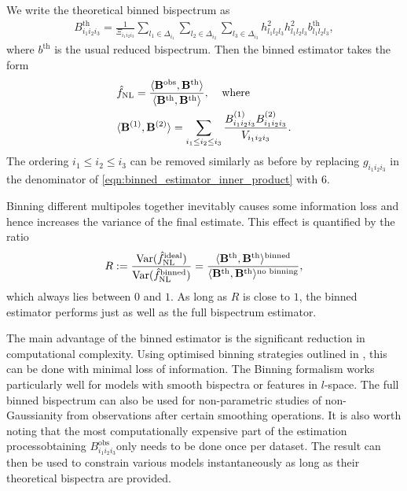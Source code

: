 We write the theoretical binned bispectrum as
\begin{align}
	B^\text{th}_{i_1 i_2 i_3} =  \frac{1}{\Xi_{i_1 i_2 i_3}} \sum_{l_1 \in \Delta_{i_1}} \sum_{l_2 \in \Delta_{i_2}} \sum_{l_3 \in \Delta_{i_3}} h^2_{l_1 l_2 l_3} h^2_{l_1 l_2 l_3} b^\text{th}_{l_1 l_2 l_3}, \label{eqn:binned_estimator_theoretical_bispectra}
\end{align}
where $b^\text{th}$ is the usual reduced bispectrum. Then the binned estimator takes the form
\begin{align}
	&\hat{f}_\text{NL} = \frac{\langle \mathbf{B}^\text{obs}, \mathbf{B}^\text{th} \rangle}{\langle \mathbf{B}^\text{th}, \mathbf{B}^\text{th} \rangle}, \;\;\;\;\text{where} \\
	&\langle \mathbf{B}^{(1)}, \mathbf{B}^{(2)} \rangle = \sum_{i_1 \le i_2 \le i_3} \frac{B^{(1)}_{i_1 i_2 i_3} B^{(2)}_{i_1 i_2 i_3}}{V_{i_1 i_2 i_3}}. \label{eqn:binned_estimator_inner_product}
\end{align}
The ordering $i_1 \le i_2 \le i_3$ can be removed similarly as before by replacing $g_{i_1 i_2 i_3}$ in the denominator of \eqref{eqn:binned_estimator_inner_product} with $6$.

Binning different multipoles together inevitably causes some information loss and hence increases the variance of the final estimate. This effect is quantified by the ratio
\begin{align}
	R := \frac{\text{Var}(\hat{f}^\text{ideal}_\text{NL})}{\text{Var}(\hat{f}^\text{binned}_\text{NL})} = \frac{\langle \mathbf{B}^\text{th}, \mathbf{B}^\text{th} \rangle^\text{binned}}{\langle \mathbf{B}^\text{th}, \mathbf{B}^\text{th} \rangle^\text{no binning}}, 
\end{align}
which always lies between $0$ and $1$. As long as $R$ is close to $1$, the binned estimator performs just as well as the full bispectrum estimator.

The main advantage of the binned estimator is the significant reduction in computational complexity. Using optimised binning strategies outlined in \cite{Bucher2016}, this can be done with minimal loss of information. The Binning formalism works particularly well for models with smooth bispectra or features in $l$-space. The full binned bispectrum can also be used for non-parametric studies of non-Gaussianity from observations after certain smoothing operations. It is also worth noting that the most computationally expensive part of the estimation process\textemdash obtaining $B^\text{obs}_{i_1 i_2 i_3}$\textemdash only needs to be done once per dataset. The result can then be used to constrain various models instantaneously as long as their theoretical bispectra are provided.

